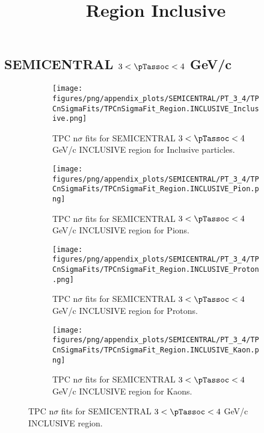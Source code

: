     
            \subsection*{SEMICENTRAL $3 < \pTassoc < 4$ GeV/c}
            \begin{figure}[H]
                \title{Region Inclusive}
                \begin{subfigure}[b]{0.5\textwidth}
                    \centering
                    \texttt{[image: figures/png/appendix\_plots/SEMICENTRAL/PT\_3\_4/TPCnSigmaFits/TPCnSigmaFit\_Region.INCLUSIVE\_Inclusive.png]}
                    \caption{TPC n$\sigma$ fits for SEMICENTRAL $3 < \pTassoc < 4$ GeV/c INCLUSIVE region for Inclusive particles.}
                    \label{fig:appendix_SEMICENTRAL_$3 < \pTassoc < 4$ GeV/c_INCLUSIVE_Inclusive}
                \end{subfigure}
                \begin{subfigure}[b]{0.5\textwidth}
                    \centering
                    \texttt{[image: figures/png/appendix\_plots/SEMICENTRAL/PT\_3\_4/TPCnSigmaFits/TPCnSigmaFit\_Region.INCLUSIVE\_Pion.png]}
                    \caption{TPC n$\sigma$ fits for SEMICENTRAL $3 < \pTassoc < 4$ GeV/c INCLUSIVE region for Pions.}
                    \label{fig:appendix_SEMICENTRAL_$3 < \pTassoc < 4$ GeV/c_INCLUSIVE_Pion}
                \end{subfigure}
                \begin{subfigure}[b]{0.5\textwidth}
                    \centering
                    \texttt{[image: figures/png/appendix\_plots/SEMICENTRAL/PT\_3\_4/TPCnSigmaFits/TPCnSigmaFit\_Region.INCLUSIVE\_Proton.png]}
                    \caption{TPC n$\sigma$ fits for SEMICENTRAL $3 < \pTassoc < 4$ GeV/c INCLUSIVE region for Protons.}
                    \label{fig:appendix_SEMICENTRAL_$3 < \pTassoc < 4$ GeV/c_INCLUSIVE_Proton}
                \end{subfigure}
                \begin{subfigure}[b]{0.5\textwidth}
                    \centering
                    \texttt{[image: figures/png/appendix\_plots/SEMICENTRAL/PT\_3\_4/TPCnSigmaFits/TPCnSigmaFit\_Region.INCLUSIVE\_Kaon.png]}
                    \caption{TPC n$\sigma$ fits for SEMICENTRAL $3 < \pTassoc < 4$ GeV/c INCLUSIVE region for Kaons.}
                    \label{fig:appendix_SEMICENTRAL_$3 < \pTassoc < 4$ GeV/c_INCLUSIVE_Kaon}
                \end{subfigure}
                \caption{TPC n$\sigma$ fits for SEMICENTRAL $3 < \pTassoc < 4$ GeV/c INCLUSIVE region.}
                \label{fig:appendix_SEMICENTRAL_$3 < \pTassoc < 4$ GeV/c_INCLUSIVE}
            \end{figure}
